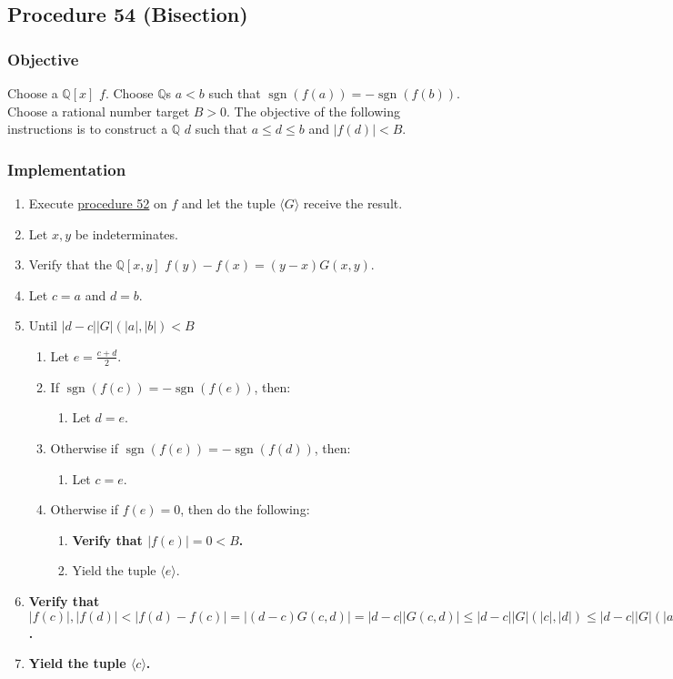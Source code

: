 \documentclass[twocolumn]{article}
\DeclareMathOperator{\sgn}{sgn}
\begin{document}
		\subsection{Procedure 54 (Bisection)}\label{sec:procedure 54}
			\subsubsection{Objective}
				Choose a $\mathbb{Q}[x]$ $f$. Choose $\mathbb{Q}$s $a<b$ such that $\sgn(f(a))=-\sgn(f(b))$. Choose a rational number target $B>0$. The objective of the following instructions is to construct a $\mathbb{Q}$ $d$ such that $a\le d\le b$ and $\lvert f(d)\rvert<B$.
			\subsubsection{Implementation}
				\begin{enumerate}
					\item Execute \hyperref[sec:procedure 52]{procedure 52} on $f$ and let the tuple $\langle G\rangle$ receive the result.
					\item Let $x,y$ be indeterminates.
					\item Verify that the $\mathbb{Q}[x,y]$ $f(y)-f(x)=(y-x)G(x,y)$.
					\item Let $c=a$ and $d=b$.
					\item Until $\lvert d-c\rvert \lvert G\rvert(\lvert a\rvert,\lvert b\rvert)<B$
					\begin{enumerate}
						\item Let $e=\frac{c+d}{2}$.
						\item If $\sgn(f(c))=-\sgn(f(e))$, then:
						\begin{enumerate}
							\item Let $d=e$.
						\end{enumerate}
						\item Otherwise if $\sgn(f(e))=-\sgn(f(d))$, then:
						\begin{enumerate}
							\item Let $c=e$.
						\end{enumerate}
						\item Otherwise if $f(e)=0$, then do the following:
						\begin{enumerate}
							\item \textbf{Verify that $\lvert f(e)\rvert=0<B$.}
							\item Yield the tuple $\langle e\rangle$.
						\end{enumerate}
					\end{enumerate}
					\item \textbf{Verify that $\lvert f(c)\rvert,\lvert f(d)\rvert<\lvert f(d)-f(c)\rvert=\lvert(d-c)G(c,d)\rvert=\lvert d-c\rvert\lvert G(c,d)\rvert\le\lvert d-c\rvert\lvert G\rvert(\lvert c\rvert,\lvert d\rvert)\le\lvert d-c\rvert\lvert G\rvert(\lvert a\rvert,\lvert b\rvert)<B$.}
					\item \textbf{Yield the tuple $\langle c\rangle$.}
				\end{enumerate}
\end{document}

